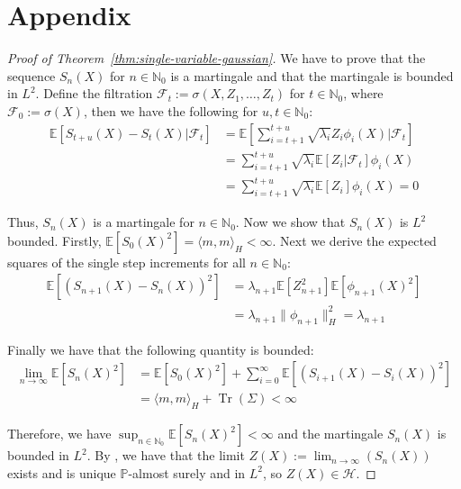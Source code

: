 \documentclass{article}
\begin{document}
\section{Appendix} \label{appendix}

\begin{proof}[Proof of Theorem~\ref{thm:single-variable-gaussian}]
We have to prove that the sequence $S_n (X)$ for $n \in \mathbb{N}_0$ is a martingale and that the martingale is bounded in $L^2$. Define the filtration $\mathcal{F}_t := \sigma(X, Z_1, \ldots, Z_t)$ for $t \in \mathbb{N}_0$, where $\mathcal{F}_0 := \sigma(X)$, then we have the following for $u , t \in \mathbb{N}_0$:
\begin{align}
\mathbb{E}[S_{t + u} (X) - S_t(X)|\mathcal{F}_t] & = \mathbb{E}\left[\sum_{i = t + 1}^{t + u} \sqrt{\lambda_i} Z_i \phi_i(X)\Bigg|\mathcal{F}_t\right] \\
 & = \sum_{i = t + 1}^{t + u} \sqrt{\lambda_i} \mathbb{E}[Z_i |\mathcal{F}_t] \phi_i(X) \\
 & = \sum_{i = t + 1}^{t + u} \sqrt{\lambda_i} \mathbb{E}[Z_i] \phi_i(X) = 0
\end{align}

Thus, $S_n(X)$ is a martingale for $n \in \mathbb{N}_0$. Now we show that $S_n(X)$ is $L^2$ bounded. Firstly, $\mathbb{E}[S_0(X)^2] = \langle m , m \rangle_H < \infty$. Next we derive the expected squares of the single step increments for all $n \in \mathbb{N}_0$:
\begin{align}
\mathbb{E}[(S_{n + 1} (X) - S_n (X))^2] & = \lambda_{n + 1}\mathbb{E}[Z_{n + 1}^2] \mathbb{E}[\phi_{n + 1} (X)^2] \\
 & =\lambda_{n + 1}\|\phi_{n + 1}\|_H^2 = \lambda_{n + 1}
\end{align}

Finally we have that the following quantity is bounded:
\begin{align}
\lim_{n \rightarrow \infty}\mathbb{E}[S_n (X)^2] & = \mathbb{E}[S_0 (X)^2] + \sum_{i = 0}^{\infty} \mathbb{E}[(S_{i + 1} (X) - S_i (X))^2] \\
 & = \langle m , m \rangle_H + \operatorname{Tr}(\Sigma) < \infty
\end{align}

Therefore, we have $\sup_{n \in \mathbb{N}_0} \mathbb{E}[S_n(X)^2] < \infty$ and the martingale $S_n(X)$ is bounded in $L^2$. By \cite[Theorem 12.1.1]{Williams_1991}, we have that the limit $Z(X) := \lim_{n \rightarrow \infty} (S_n(X))$ exists and is unique $\mathbb{P}$-almost surely and in $L^2$, so $Z(X) \in \mathcal{H}$. 
\end{proof}
\end{document}
